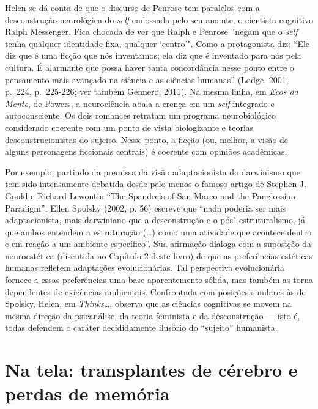Helen se dá conta de que o discurso de Penrose tem paralelos com a
desconstrução neurológica do \emph{self} endossada pelo seu amante, o cientista
cognitivo Ralph Messenger. Fica chocada de ver que Ralph e Penrose
``negam que o \emph{self} tenha qualquer identidade fixa, qualquer `centro'".
Como a protagonista diz: ``Ele diz que é uma ficção que nós inventamos;
ela diz que é inventado para nós pela cultura. É alarmante que possa
haver tanta concordância nesse ponto entre o pensamento mais avançado na
ciência e as ciências humanas'' (Lodge, 2001, p.~224, p.~225-226; ver
também Gennero, 2011). Na mesma linha, em \emph{Ecos da Mente}, de
Powers, a neurociência abala a crença em um \emph{self} integrado e
autoconsciente. Os dois romances retratam um programa neurobiológico
considerado coerente com um ponto de vista biologizante e teorias
desconstrucionistas do sujeito. Nesse ponto, a ficção (ou, melhor, a
visão de alguns personagens ficcionais centrais) é coerente com opiniões
acadêmicas.

Por exemplo, partindo da premissa da visão adaptacionista do darwinismo
que tem sido intensamente debatida desde pelo menos o famoso artigo de
Stephen J. Gould e Richard Lewontin ``The Spandrels of San Marco and the
Panglossian Paradigm'', Ellen Spolsky (2002, p. 56) escreve que ``nada
poderia ser mais adaptacionista, mais darwiniano que a desconstrução e o
pós"-estruturalismo, já que ambos entendem a estruturação (\ldots{}) como uma
atividade que acontece dentro e em reação a um ambiente específico''.
Sua afirmação dialoga com a suposição da neuroestética (discutida no
Capítulo 2 deste livro) de que as preferências estéticas humanas
refletem adaptações evolucionárias. Tal perspectiva evolucionária
fornece a essas preferências uma base aparentemente sólida, mas também
as torna dependentes de exigências ambientais. Confrontada com posições
similares às de Spolsky, Helen, em \emph{Thinks\ldots{}}, observa que as
ciências cognitivas se movem na mesma direção da psicanálise, da teoria
feminista e da desconstrução --- isto é, todas defendem o caráter
decididamente ilusório do ``sujeito'' humanista.

\section{Na tela: transplantes de cérebro e perdas de memória}

